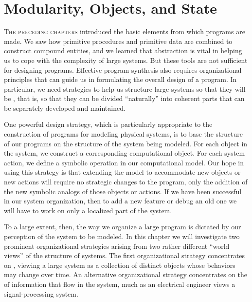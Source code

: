 \chapter{Modularity, Objects, and State}
\label{Chapter 3}


\vspace{1.8em}




\vspace{2em}



\lettrine{T}{he preceding chapters} introduced the basic elements from which programs are made.
We saw how primitive procedures and primitive data are combined to construct compound entities, and we learned that abstraction is vital in helping us to cope with the complexity of large systems.
But these tools are not sufficient for designing programs.
Effective program synthesis also requires organizational principles that can guide us in formulating the overall design of a program.
In particular, we need strategies to help us structure large systems so that they will be , that is, so that they can be divided “naturally” into coherent parts that can be separately developed and maintained.

One powerful design strategy, which is particularly appropriate to the construction of programs for modeling physical systems, is to base the structure of our programs on the structure of the system being modeled.
For each object in the system, we construct a corresponding computational object.
For each system action, we define a symbolic operation in our computational model.
Our hope in using this strategy is that extending the model to accommodate new objects or new actions will require no strategic changes to the program, only the addition of the new symbolic analogs of those objects or actions.
If we have been successful in our system organization, then to add a new feature or debug an old one we will have to work on only a localized part of the system.

To a large extent, then, the way we organize a large program is dictated by our perception of the system to be modeled.
In this chapter we will investigate two prominent organizational strategies arising from two rather different “world views” of the structure of systems.
The first organizational strategy concentrates on , viewing a large system as a collection of distinct objects whose behaviors may change over time.
An alternative organizational strategy concentrates on the  of information that flow in the system, much as an electrical engineer views a signal-processing system.

